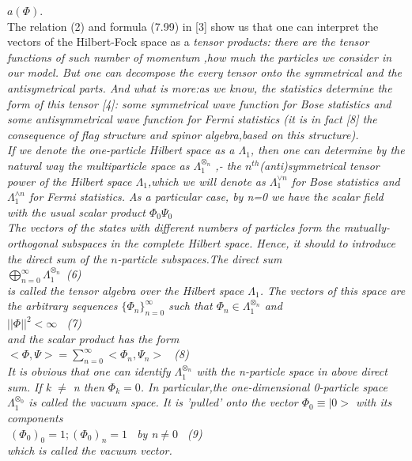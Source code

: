 \documentclass[a4paper,12pt] {article}
\begin{document}
  $ a(\Phi ) $.\\ The relation (2) and formula (7.99) in [3] show us  that one can interpret the vectors of the
 Hilbert-Fock space as a \it  tensor products\rm : there are the  \it  tensor functions of such number of
 momentum ,how much the particles we consider in our model.
\rm But one can decompose the every tensor onto  \it the symmetrical and the antisymetrical parts.
 \rm And what is more:as we  know, the  statistics determine the form of this tensor [4]: some symmetrical
 wave function for Bose statistics and some antisymmetrical wave function for Fermi statistics (it is in
 fact [8] the consequence of  flag structure  and  spinor algebra,based on this structure).
\\ If we denote the one-particle  Hilbert space as a $\Lambda_1$, then one can determine by the natural
way the multiparticle space   as
 $\Lambda_1^{\otimes_ n} $ ,- \it the $n^{th}$\it  (anti)symmetrical  tensor power  of the  Hilbert space
$\Lambda_1$,\rm which we will denote as  $\Lambda_1^{\vee n} $ for Bose statistics and
 $\Lambda_1^{\wedge n} $ for Fermi statistics.
 As a particular case, by n=0 we have the scalar field with the usual scalar product $ \Phi_0 \Psi_0 $
\\ The vectors of the  states with different numbers of particles form the  mutually-orthogonal subspaces
 in the complete Hilbert  space. Hence, \it it should to introduce the direct sum of the $n$-\it particle
subspaces.\rm The direct sum  \\$\bigoplus_ {n=0}^\infty \Lambda_1^{\otimes_ n} $\ (6)\\ is called
\it the tensor algebra over the Hilbert space  $\Lambda_1$. \rm The vectors  of this space are the arbitrary
sequences $ \lbrace\Phi_n \rbrace_{n=0}^\infty $  such that  $\Phi_n \in   \Lambda_1^{\otimes_ n} $
and \\$ \vert\vert \Phi  \vert\vert^2 <\infty $ \   (7)\\
 and the scalar product has the form \\$ < \Phi, \Psi > = \sum _ {n=0}^\infty <\Phi_n , \Psi_n > $ \ (8)
 \\ It is obvious that one can identify  $ \Lambda_1^{\otimes_ n} $  with the n-particle space in above
direct sum. If  k $\neq$ n  then  $\Phi_k =0$. In particular,the  one-dimensional 0-particle  space
$  \Lambda_1^{\otimes_ 0} $ is called  \it the vacuum space. \rm It is \it  'pulled'  \rm onto  the vector
 $\Phi_0 \equiv \vert 0> $ with its components
\\$\ (\Phi_0)_0 =1;    (\Phi_0)_n =1$ \ by n$\neq0 $ \    (9) \\which is called  \it the vacuum vector. \rm
\end{document}
